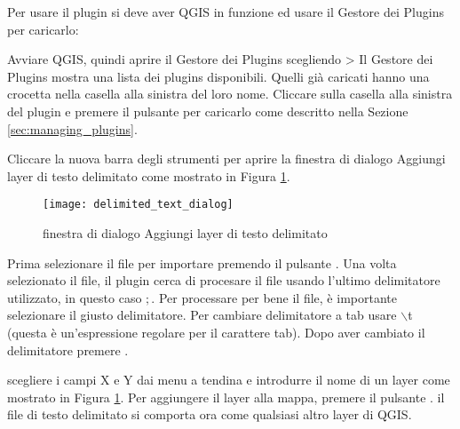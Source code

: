 Per usare il plugin si deve aver QGIS in funzione ed usare il Gestore dei Plugins per caricarlo:

Avviare QGIS, quindi aprire il Gestore dei Plugins scegliendo  > 
Il Gestore dei Plugins mostra una lista dei plugins disponibili. Quelli già caricati hanno una crocetta nella casella alla sinistra del loro nome.
Cliccare sulla casella alla sinistra del plugin  e premere il pulsante  per caricarlo come descritto nella Sezione \ref{sec:managing_plugins}.

Cliccare la nuova barra degli strumenti  per aprire la finestra di dialogo Aggiungi layer di testo delimitato come mostrato in Figura
\ref{fig:delim_text_plugin_dialog}.

\begin{figure}[ht]
   \begin{center}
   \caption{finestra di dialogo Aggiungi layer di testo delimitato \nixcaption}\label{fig:delim_text_plugin_dialog}\smallskip
   \texttt{[image: delimited\_text\_dialog]}
   \end{center}  
\end{figure}

Prima selezionare il file  per importare premendo il pulsante . Una volta selezionato il file, il plugin cerca di procesare il file usando l'ultimo delimitatore utilizzato, in questo caso \mbox{$;$}. Per processare per bene il file, è importante selezionare il giusto delimitatore. Per cambiare delimitatore a tab usare \mbox{$\backslash$}t (questa è un'espressione regolare per il carattere tab).
Dopo aver cambiato il delimitatore premere .

scegliere i campi X e Y dai menu a tendina e introdurre il nome di un layer  
come mostrato in Figura \ref{fig:delim_text_plugin_dialog}. Per aggiungere il layer alla mappa, premere il pulsante . il file di testo delimitato si comporta ora come qualsiasi altro layer di QGIS.
